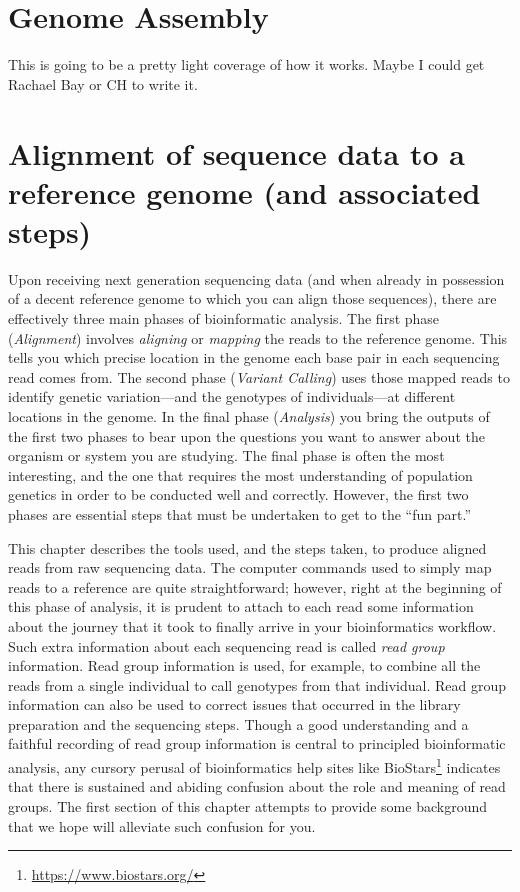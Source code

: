 \documentclass[]{krantz}
\renewcommand{\href}[2]{#2\footnote{\url{#1}}}
\begin{document}
\hypertarget{genome-assembly}{%
\chapter{Genome Assembly}\label{genome-assembly}}

This is going to be a pretty light coverage of how it works. Maybe I could get Rachael
Bay or CH to write it.

\hypertarget{alignment-of-sequence-data-to-a-reference-genome-and-associated-steps}{%
\chapter{Alignment of sequence data to a reference genome (and associated steps)}\label{alignment-of-sequence-data-to-a-reference-genome-and-associated-steps}}

Upon receiving next generation sequencing data (and when already in possession
of a decent reference genome to which you can align those sequences), there are
effectively three main phases of bioinformatic analysis. The first phase (\emph{Alignment}) involves
\emph{aligning} or \emph{mapping} the reads to the reference genome. This tells you which precise
location in the
genome each base pair in each sequencing read comes from. The second phase (\emph{Variant Calling})
uses those mapped reads to identify genetic variation---and the genotypes of individuals---at
different locations in the genome. In the final phase (\emph{Analysis}) you bring the outputs of
the first two phases to bear upon the questions you want to answer about the organism
or system you are studying. The final phase is often the most interesting, and the one that
requires the most understanding of population genetics in order to be conducted well
and correctly. However, the first two phases are essential steps that must be undertaken
to get to the ``fun part.''

This chapter describes the tools used, and the steps taken, to produce aligned reads from raw
sequencing data. The computer commands used to simply map
reads to a reference are quite straightforward;
however, right at the beginning of this phase of analysis, it is prudent to attach to each
read some information about the journey that it took to finally arrive in your bioinformatics
workflow. Such extra information about each sequencing read is called \emph{read group} information.
Read group information is used, for example, to combine all the reads from
a single individual to call genotypes from that individual.
Read group information can
also be used to correct issues that occurred in the library preparation and
the sequencing steps. Though a good understanding and a faithful recording of read group
information is central to principled bioinformatic analysis, any cursory perusal of
bioinformatics help sites like \href{https://www.biostars.org/}{BioStars} indicates that
there is sustained and abiding confusion about the role and meaning of read groups.
The first section of this chapter attempts to provide some background that we hope
will alleviate such confusion for you.
\end{document}
